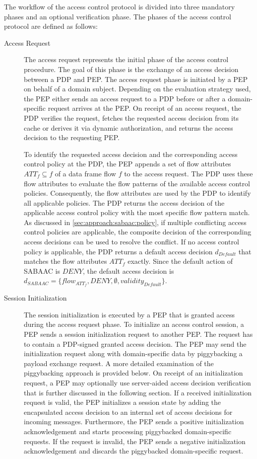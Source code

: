 The workflow of the access control protocol is divided into three mandatory phases and an optional verification phase.
The phases of the access control protocol are defined as follows:
\begin{description}
    \item[Access Request] The access request represents the initial phase of the access control procedure.
    The goal of this phase is the exchange of an access decision between a PDP and PEP.
    The access request phase is initiated by a PEP on behalf of a domain subject.
    Depending on the evaluation strategy used, the PEP either sends an access request to a PDP before or after a domain-specific request arrives at the PEP.
    On receipt of an access request, the PDP verifies the request, fetches the requested access decision from its cache or derives it via dynamic authorization, and returns the access decision to the requesting PEP.

    To identify the requested access decision and the corresponding access control policy at the PDP, the PEP appends a set of flow attributes $ATT_{f} \subseteq f$ of a data frame flow $f$ to the access request.
    The PDP uses these flow attributes to evaluate the flow patterns of the available access control policies.
    Consequently, the flow attributes are used by the PDP to identify all applicable policies.
    The PDP returns the access decision of the applicable access control policy with the most specific flow pattern match.
    As discussed in \autoref{sec:approach:sabaac:policy}, if multiple conflicting access control policies are applicable, the composite decision of the corresponding access decisions can be used to resolve the conflict.
    If no access control policy is applicable, the PDP returns a default access decision $d_{Default}$ that matches the flow attributes $ATT_{f}$ exactly.
    Since the default action of SABAAC is $DENY$, the default access decision is $d_{SABAAC} = \{flow_{ATT_{f}}, DENY, \emptyset, validity_{Default}\}$.

    \item[Session Initialization] The session initialization is executed by a PEP that is granted access during the access request phase.
    To initialize an access control session, a PEP sends a session initialization request to another PEP.
    The request has to contain a PDP-signed granted access decision.
    The PEP may send the initialization request along with domain-specific data by piggybacking a payload exchange request.
    A more detailed examination of the piggybacking approach is provided below.
    On receipt of an initialization request, a PEP may optionally use server-aided access decision verification that is further discussed in the following section.
    If a received initialization request is valid, the PEP initializes a session state by adding the encapsulated access decision to an internal set of access decisions for incoming messages.
    Furthermore, the PEP sends a positive initialization acknowledgement and starts processing piggybacked domain-specific requests.
    If the request is invalid, the PEP sends a negative initialization acknowledgement and discards the piggybacked domain-specific request.


\end{description}
